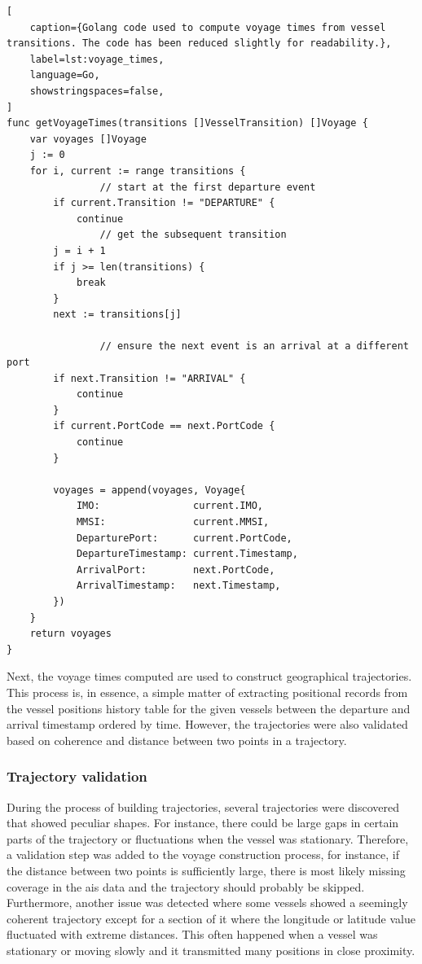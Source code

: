 \begin{lstlisting}[
    caption={Golang code used to compute voyage times from vessel transitions. The code has been reduced slightly for readability.},
    label=lst:voyage_times,
    language=Go,
    showstringspaces=false,
]
func getVoyageTimes(transitions []VesselTransition) []Voyage {
	var voyages []Voyage
	j := 0
	for i, current := range transitions {
                // start at the first departure event
		if current.Transition != "DEPARTURE" {
			continue
                // get the subsequent transition
		j = i + 1
		if j >= len(transitions) {
			break
		}
		next := transitions[j]

                // ensure the next event is an arrival at a different port
		if next.Transition != "ARRIVAL" {
			continue
		}
		if current.PortCode == next.PortCode {
			continue
		}

		voyages = append(voyages, Voyage{
			IMO:                current.IMO,
			MMSI:               current.MMSI,
			DeparturePort:      current.PortCode,
			DepartureTimestamp: current.Timestamp,
			ArrivalPort:        next.PortCode,
			ArrivalTimestamp:   next.Timestamp,
		})
	}
	return voyages
}
\end{lstlisting}

Next, the voyage times computed are used to construct geographical trajectories. This process is, in essence, a simple matter of extracting positional records from the vessel positions history table for the given vessels between the departure and arrival timestamp ordered by time. However, the trajectories were also validated based on coherence and distance between two points in a trajectory.

\subsubsection{Trajectory validation}

During the process of building trajectories, several trajectories were discovered that showed peculiar shapes. For instance, there could be large gaps in certain parts of the trajectory or fluctuations when the vessel was stationary. Therefore, a validation step was added to the voyage construction process, for instance, if the distance between two points is sufficiently large, there is most likely missing coverage in the \acrshort{ais} data and the trajectory should probably be skipped. Furthermore, another issue was detected where some vessels showed a seemingly coherent trajectory except for a section of it where the longitude or latitude value fluctuated with extreme distances. This often happened when a vessel was stationary or moving slowly and it transmitted many positions in close proximity.

